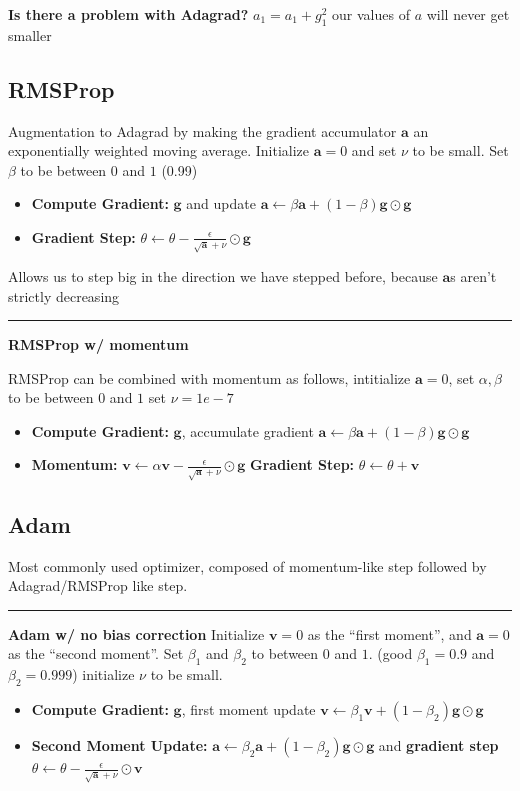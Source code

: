 \documentclass[twocolumn, letter, 10pt, landscape]{article}
\newcommand{\mb}{\mathbf}
\newcommand{\tb}{\textbf}
\newcommand{\bit}{\vspace{-0.1in}\begin{itemize}\setlength\itemsep{-0.05in}}
\newcommand{\eit}{\end{itemize}\vspace{-0.1in}}
\newcommand{\eps}{\epsilon}
\begin{document}
\tb{Is there a problem with Adagrad?} $a_1=a_1+g_1^2$ our values of $a$ will never get smaller

\subsection{RMSProp}
Augmentation to Adagrad by making the gradient accumulator $\mb{a}$ an exponentially weighted moving average. Initialize $\mb{a}=0$ and set $\nu$ to be small. Set $\beta$ to be between $0$ and $1$ (0.99)
\bit{}
\item \tb{Compute Gradient:} $\mb{g}$ and update $\mb{a}\leftarrow\beta\mb{a}+(1-\beta)\mb{g}\odot\mb{g}$
\item \tb{Gradient Step:} $\theta\leftarrow\theta-\frac{\eps}{\sqrt{\mb{a}}+\nu}\odot\mb{g}$
\eit{}

Allows us to step big in the direction we have stepped before, because $\mb{a}$s aren't strictly decreasing
\hrule
\tb{RMSProp w/ momentum}

RMSProp can be combined with momentum as follows, intitialize $\mb{a}=0$, set $\alpha,\beta$ to be between $0$ and $1$ set $\nu=1e-7$

\bit{}
\item \tb{Compute Gradient:} $\mb{g}$, accumulate gradient $\mb{a}\leftarrow\beta\mb{a}+(1-\beta)\mb{g}\odot\mb{g}$
\item \tb{Momentum:} $\mb{v}\leftarrow\alpha\mb{v}-\frac{\eps}{\sqrt{\mb{a}}+\nu}\odot\mb{g}$ \tb{Gradient Step:} $\theta\leftarrow\theta+\mb{v}$
\eit{}

\subsection{Adam}
Most commonly used optimizer, composed of momentum-like step followed by Adagrad/RMSProp like step.
\hrule
\tb{Adam w/ no bias correction}
Initialize $\mb{v}=0$ as the ``first moment'', and $\mb{a}=0$ as the ``second moment''. Set $\beta_1$ and $\beta_2$ to between $0$ and $1$. (good $\beta_1=0.9$ and $\beta_2=0.999$) initialize $\nu$ to be small.

\bit{}
\item \tb{Compute Gradient:} $\mb{g}$, first moment update $\mb{v}\leftarrow\beta_1\mb{v}+(1-\beta_2)\mb{g}\odot\mb{g}$
\item \tb{Second Moment Update:} $\mb{a}\leftarrow\beta_2\mb{a}+(1-\beta_2)\mb{g}\odot\mb{g}$ and \tb{gradient step} $\theta\leftarrow\theta-\frac{\epsilon}{\sqrt{\mb{a}}+\nu}\odot\mb{v}$
\eit{}
\end{document}
